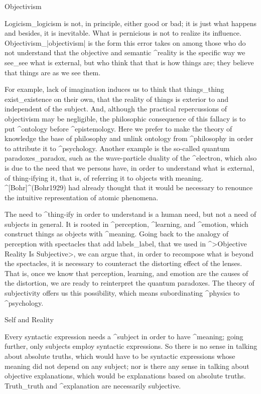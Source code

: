 \Section Objectivism

Logicism_{logicism} is not, in principle, either good or bad; it is just
what happens and besides, it is inevitable. What is pernicious is not to
realize its influence. Objectivism_|objectivism| is the form this error
takes on among those who do not understand that the objective and
semantic ^{reality} is the specific way we see_{see} what is external,
but who think that that is how things are; they believe that things are
as we see them.

For example, lack of imagination induces us to think that things_{thing}
exist_{existence} on their own, that the reality of things is exterior
to and independent of the subject. And, although the practical
repercussions of objectivism may be negligible, the philosophic
consequence of this fallacy is to put ^{ontology} before
^{epistemology}. Here we prefer to make the theory of knowledge the base
of philosophy and unlink ontology from ^{philosophy} in order to
attribute it to ^{psychology}. Another example is the so-called quantum
paradoxes_{paradox}, such as the wave-particle duality of the
^{electron}, which also is due to the need that we persons have, in
order to understand what is external, of thing-ifying it, that is, of
referring it to objects with meaning. ^[Bohr]^(Bohr1929) had already
thought that it would be necessary to renounce the intuitive
representation of atomic phenomena.

The need to ^{thing-ify} in order to understand is a human need, but not
a need of subjects in general. It is rooted in ^{perception},
^{learning}, and ^{emotion}, which construct things as objects with
^{meaning}. Going back to the analogy of perception with spectacles that
add labels_{label}, that we used in ^>Objective Reality Is Subjective>,
we can argue that, in order to recompose what is beyond the spectacles,
it is necessary to counteract the distorting effect of the lenses. That
is, once we know that perception, learning, and emotion are the causes
of the distortion, we are ready to reinterpret the quantum paradoxes.
The theory of subjectivity offers us this possibility, which means
subordinating ^{physics} to ^{psychology}.


\Section Self and Reality

Every syntactic expression needs a ^{subject} in order to have
^{meaning}; going further, only subjects employ syntactic expressions.
So there is no sense in talking about absolute truths, which would have
to be syntactic expressions whose meaning did not depend on any subject;
nor is there any sense in talking about objective explanations, which
would be explanations based on absolute truths. Truth_{truth} and
^{explanation} are necessarily subjective.

